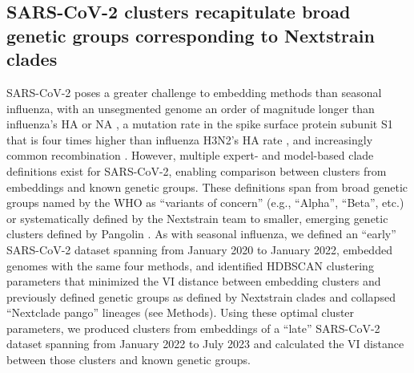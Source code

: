 \documentclass[10pt,letterpaper]{article}
\begin{document}
\subsection*{SARS-CoV-2 clusters recapitulate broad genetic groups corresponding to Nextstrain clades}

SARS-CoV-2 poses a greater challenge to embedding methods than seasonal influenza, with an unsegmented genome an order of magnitude longer than influenza's HA or NA \cite{Zhu2020}, a mutation rate in the spike surface protein subunit S1 that is four times higher than influenza H3N2's HA rate \cite{Kistler2022}, and increasingly common recombination \cite{Focosi2022,Turakhia2022}.
However, multiple expert- and model-based clade definitions exist for SARS-CoV-2, enabling comparison between clusters from embeddings and known genetic groups.
These definitions span from broad genetic groups named by the WHO as ``variants of concern'' (e.g., ``Alpha'', ``Beta'', etc.) \cite{Konings2021} or systematically defined by the Nextstrain team \cite{Hodcroft2020,Bedford2021,Roemer2022} to smaller, emerging genetic clusters defined by Pangolin \cite{OToole2021}.
As with seasonal influenza, we defined an ``early'' SARS-CoV-2 dataset spanning from January 2020 to January 2022, embedded genomes with the same four methods, and identified HDBSCAN clustering parameters that minimized the VI distance between embedding clusters and previously defined genetic groups as defined by Nextstrain clades and collapsed ``Nextclade pango'' lineages (see Methods).
Using these optimal cluster parameters, we produced clusters from embeddings of a ``late'' SARS-CoV-2 dataset spanning from January 2022 to July 2023 and calculated the VI distance between those clusters and known genetic groups.
\end{document}
